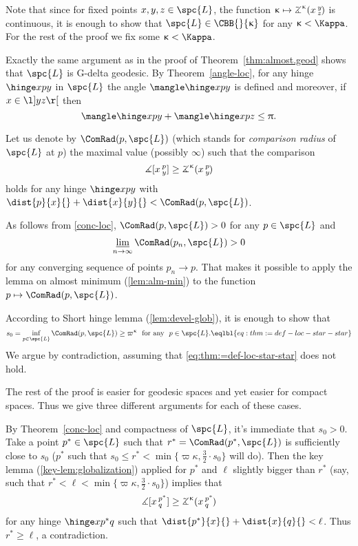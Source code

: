 Note that since for fixed points $x,y,z\in \spc{L}$, 
the function $\kappa\mapsto\angk\kappa x y z$ is continuous, 
it is enough to show that $\spc{L}\in\CBB{}{\kappa}$ 
for any $\kappa<\Kappa$.
For the rest of the proof we fix some $\kappa<\Kappa$.

Exactly the same argument as in the proof of Theorem~\ref{thm:almost.geod} 
shows that $\spc{L}$ is G-delta geodesic.
By Theorem~\ref{angle-loc}, 
for any hinge $\hinge x p y$ in $\spc{L}$ the angle $\mangle\hinge x p y$ is defined 
and moreover, if $x\in \l]y z\r[$ then
\[\mangle\hinge x p y+\mangle\hinge x p z\le \pi.\] 

Let us denote by $\ComRad(p,\spc{L})$ 
(which stands for \emph{comparison radius} of $\spc{L}$ at $p$) 
the maximal value (possibly $\infty$) such that the comparison 
\[\mangle\hinge x p y
\ge\angk\kappa x p y\]
holds for any hinge $\hinge x p y$ with $\dist{p}{x}{}+\dist{x}{y}{}< \ComRad(p,\spc{L})$.

As follows from \ref{conc-loc}, $\ComRad(p,\spc{L})>0$ for any $p\in\spc{L}$ and 
$$\liminf_{n\to\infty}\ComRad(p_n,\spc{L})>0$$ 
for any converging sequence of points $p_n\to p$.
That makes it possible to apply the lemma on almost minimum (\ref{lem:alm-min}) to the function $p\mapsto \ComRad(p,\spc{L})$.

According to Short hinge lemma (\ref{lem:devel-glob}), it is enough to show that 
\[s_0=\inf_{p\in\spc{L}}\ComRad(p,\spc{L})
\ge \varpi\kappa\ \ 
\text{for any}\ \ 
p\in \spc{L}.
\eqlbl{eq:thm:=def-loc-star-star}\]
We argue by contradiction, assuming that  \ref{eq:thm:=def-loc-star-star} does not hold.

The rest of the proof is easier for geodesic spaces 
and yet easier for compact spaces.
Thus we give three different arguments  for each of these cases.

\parit{End of the proof for a compact space.}
By Theorem~\ref{conc-loc} 
and compactness of $\spc{L}$, 
it's immediate that $s_0>0$.
Take a point $p^*\in \spc{L}$ such that $r^*=\ComRad(p^*,\spc{L})$ is sufficiently close to $s_0$
($p^*$ such that  $s_0\le r^*<\min\{\varpi\kappa,\tfrac32\cdot s_0\}$ will do).
Then the key lemma (\ref{key-lem:globalization}) applied for $p^*$ and $\ell$ slightly bigger than $r^*$ (say, such that $r^*<\ell<\min\{\varpi\kappa,\tfrac32\cdot s_0\}$) implies that
\[\mangle\hinge x{p^*}q
\ge\angk\kappa x{p^*}q\]
for any hinge $\hinge x{p^*}q$ such that $\dist{p^*}{x}{}+\dist{x}{q}{}<\ell$.
Thus $r^*\ge\ell$, a contradiction.

